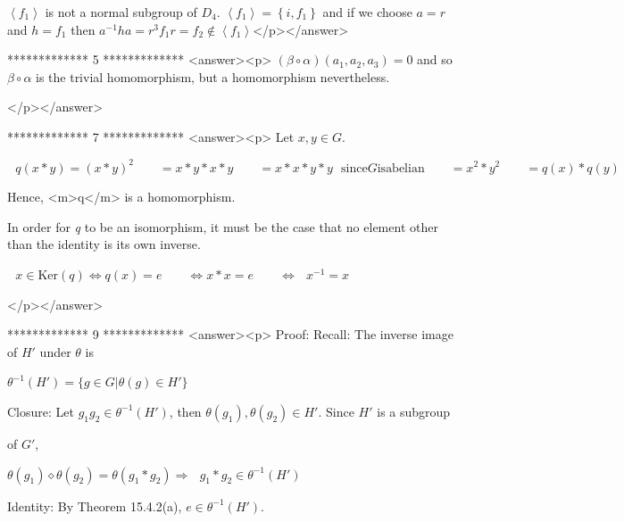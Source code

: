\(\left\langle f_1\right\rangle\) is not a normal subgroup of \(D_4\).  \(\left\langle f_1\right\rangle =\left\{i,f_1\right\}\) and if we choose
\(a = r\) and \(h=f_1\) then \(a^{-1}h a= r^3f_1r=f_2\notin \left\langle f_1\right\rangle\)</p></answer>


*************
5
*************
<answer><p>  \((\beta \circ  \alpha )\left(a_1,a_2,a_3\right) = 0\)  and so \(\beta \circ \alpha\)  is the trivial homomorphism, but a homomorphism
nevertheless.

</p></answer>


*************
7
*************
<answer><p> Let \(x, y \in G\).



\(\text{               }q(x * y) = (x * y)^2\quad \quad = x*y *x*y\quad \quad =x * x*y *y\text{   }\text{since} G \text{is} \text{abelian}\quad
\quad =x^2*y^2\quad \quad = q(x)*q(y)\)



Hence, <m>q</m> is a homomorphism.



In order for \textit{ q }to be an isomorphism, it must be the case that no element other than the identity is its own inverse.



              \(\text{        }x \in \text{Ker} (q) \Leftrightarrow  q (x) = e \quad \quad \Leftrightarrow  x * x =e \quad \quad \Leftrightarrow
\text{  }x^{-1}= x\)

</p></answer>


*************
9
*************
<answer><p> Proof: Recall: The inverse image of \(H'\) under $\theta $ is



\(\theta ^{-1}(H')=\{g\in G | \theta (g)\in H'\}\)



Closure:   Let \(g_1g_2\in \theta ^{-1}(H')\), then \(\theta \left(g_1\right),\theta \left(g_2\right)\in H'\).  Since \(H'\) is a subgroup



of \(G'\), 



\(\theta \left(g_1\right)\diamond \theta \left(g_2\right)=\theta \left(g_1*g_2\right) \Rightarrow \text{  }g_1*g_2\in \theta ^{-1}(H')\)







Identity: By Theorem 15.4.2(a), \(e \in \theta ^{-1}(H')\).



